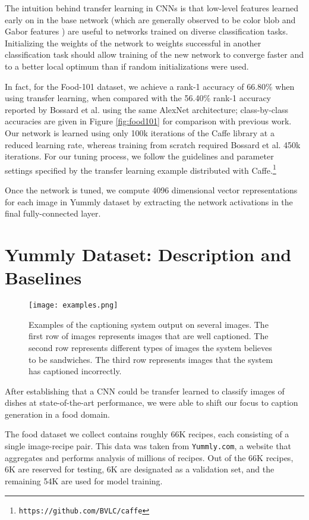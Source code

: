 \documentclass[11pt]{article}
\begin{document}
The intuition behind transfer learning in CNNs is that low-level
features learned early on in the base network (which are generally
observed to be color blob and Gabor features
\cite{yosinski2014transferable}) are useful to networks trained on
diverse classification tasks. Initializing the weights of the network
to weights successful in another classification task should allow
training of the new network to converge faster and to a better local
optimum than if random initializations were used.

In fact, for the Food-101 dataset, we achieve a rank-1 accuracy of
66.80\% when using transfer learning, when compared with the 56.40\%
rank-1 accuracy reported by Bossard et al.  using
the same AlexNet architecture; class-by-class accuracies are given in
Figure \ref{fig:food101} for comparison with previous work. Our network is
learned using only 100k iterations of the Caffe library at a reduced
learning rate, whereas training from scratch required Bossard et
al. 450k iterations. For our tuning process, we follow the guidelines
and parameter settings specified by the transfer learning example
distributed with Caffe.\footnote{{\tt https://github.com/BVLC/caffe}}

Once the network is tuned, we compute 4096 dimensional vector
representations for each image in Yummly dataset by extracting the
network activations in the final fully-connected layer.

\section{Yummly Dataset: Description and Baselines}
\begin{figure*}[ht]
\centering
\texttt{[image: examples.png]}
\caption{Examples of the captioning system output on several
  images. The first row of images represents images that are well
  captioned. The second row represents different types of images the
  system believes to be sandwiches. The third row represents images
  that the system has captioned incorrectly.}
\label{fig:examples}
\end{figure*}

After establishing that a CNN could be transfer learned to classify
images of dishes at state-of-the-art performance, we were able to
shift our focus to caption generation in a food domain.

The food dataset we collect contains roughly 66K recipes, each
consisting of a single image-recipe pair. This data was taken from
{\tt Yummly.com}, a website that aggregates and performs analysis of
millions of recipes. Out of the 66K recipes, 6K are reserved for
testing, 6K are designated as a validation set, and the remaining 54K
are used for model training.
\end{document}
